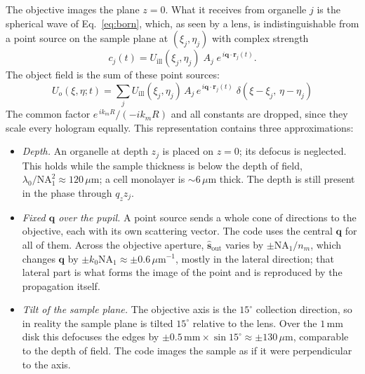 \documentclass[11pt,a4paper]{article}
\newcommand{\vr}{\mathbf{r}}
\newcommand{\vq}{\mathbf{q}}
\newcommand{\shat}{\hat{\mathbf{s}}}
\newcommand{\um}{\,\mu\mathrm{m}}
\newcommand{\mm}{\,\mathrm{mm}}
\newcommand{\ee}{e}
\begin{document}
The objective images the plane $z=0$. What it receives from organelle $j$ is
the spherical wave of Eq.~\eqref{eq:born}, which, as seen by a lens, is
indistinguishable from a point source on the sample plane at
$(\xi_j,\eta_j)$ with complex strength
\begin{equation}
  c_j(t) = U_\mathrm{ill}(\xi_j,\eta_j)\;A_j\;\ee^{\,i\vq\cdot\vr_j(t)} .
  \label{eq:cj}
\end{equation}
The object field is the sum of these point sources:
\begin{equation}
  \boxed{\;U_o(\xi,\eta;t) = \sum_j U_\mathrm{ill}(\xi_j,\eta_j)\,A_j\,
  \ee^{\,i\vq\cdot\vr_j(t)}\;\delta(\xi-\xi_j,\,\eta-\eta_j)\;}
  \label{eq:Uo}
\end{equation}
The common factor $\ee^{\,ik_mR}/(-ik_mR)$ and all constants are dropped, since
they scale every hologram equally. This representation contains three
approximations:
\begin{itemize}[leftmargin=*]
  \item \emph{Depth.} An organelle at depth $z_j$ is placed on $z=0$; its
        defocus is neglected. This holds while the sample thickness is below
        the depth of field, $\lambda_0/\mathrm{NA}_1^2 \approx 120\um$; a
        cell monolayer is $\sim 6\um$ thick. The depth is still present in
        the phase through $q_z z_j$.
  \item \emph{Fixed $\vq$ over the pupil.} A point source sends a whole cone of
        directions to the objective, each with its own scattering vector. The
        code uses the central $\vq$ for all of them. Across the objective
        aperture, $\shat_\mathrm{out}$ varies by $\pm\mathrm{NA}_1/n_m$, which
        changes $\vq$ by $\pm k_0\mathrm{NA}_1 \approx \pm0.6\um^{-1}$,
        mostly in the lateral direction; that lateral part is what forms the
        image of the point and is reproduced by the propagation itself.
  \item \emph{Tilt of the sample plane.} The objective axis is the
        $15^\circ$ collection direction, so in reality the sample plane is
        tilted $15^\circ$ relative to the lens. Over the $1\mm$ disk this
        defocuses the edges by $\pm 0.5\mm\times\sin15^\circ \approx
        \pm130\um$, comparable to the depth of field. The code images the
        sample as if it were perpendicular to the axis.
\end{itemize}
\end{document}
